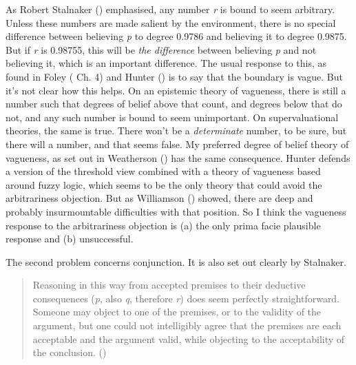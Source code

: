 \documentclass[
  11pt,
  letterpaper,
  DIV=11,
  numbers=noendperiod,
  twoside]{scrartcl}
\begin{document}
As Robert Stalnaker () emphasised,
any number \emph{r} is bound to seem arbitrary. Unless these numbers are
made salient by the environment, there is no special difference between
believing \emph{p} to degree 0.9786 and believing it to degree 0.9875.
But if \emph{r} is 0.98755, this will be \emph{the difference} between
believing \emph{p} and not believing it, which is an important
difference. The usual response to this, as found in Foley
( Ch. 4) and Hunter
() is to say that the boundary is vague.
But it's not clear how this helps. On an epistemic theory of vagueness,
there is still a number such that degrees of belief above that count,
and degrees below that do not, and any such number is bound to seem
unimportant. On supervaluational theories, the same is true. There won't
be a \emph{determinate} number, to be sure, but there will a number, and
that seems false. My preferred degree of belief theory of vagueness, as
set out in Weatherson () has
the same consequence. Hunter defends a version of the threshold view
combined with a theory of vagueness based around fuzzy logic, which
seems to be the only theory that could avoid the arbitrariness
objection. But as Williamson ()
showed, there are deep and probably insurmountable difficulties with
that position. So I think the vagueness response to the arbitrariness
objection is (a) the only prima facie plausible response and (b)
unsuccessful.

The second problem concerns conjunction. It is also set out clearly by
Stalnaker.

\begin{quote}
Reasoning in this way from accepted premises to their deductive
consequences (\emph{p}, also \emph{q}, therefore \emph{r}) does seem
perfectly straightforward. Someone may object to one of the premises, or
to the validity of the argument, but one could not intelligibly agree
that the premises are each acceptable and the argument valid, while
objecting to the acceptability of the conclusion.
()
\end{quote}
\end{document}

